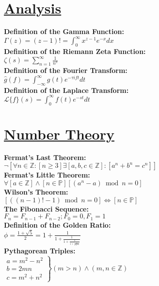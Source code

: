 \documentclass[12pt]{article}
\begin{document}
\section*{\underline{Analysis}}
\textbf{Definition of the Gamma Function:}
    \\ \( \Gamma( z ) = ( z - 1 )! = \displaystyle\int_{0}^{\infty} { x^{z - 1} e^{-x} dx } \)
\\ \textbf{Definition of the Riemann Zeta Function:}
    \\ \( \zeta( s ) = \displaystyle\sum_{n = 1}^{\infty} { \displaystyle\frac{ 1 }{ n^s } } \)
\\ \textbf{Definition of the Fourier Transform:}
    \\ \( \hat{g}( f ) = \displaystyle\int_{-\infty}^{\infty} { g( t ) e^{-\tau i ft} dt } \)
\\ \textbf{Definition of the Laplace Transform:}
    \\ \( \mathcal{L} \{ f \} ( s ) = \displaystyle\int_{0}^{\infty} { f( t ) e^{-st} dt } \)



\section*{\underline{Number Theory}}
\textbf{Fermat’s Last Theorem:}
    \\ \( \lnot [ \forall n \in \mathbb{Z} : [ n \ge 3 ] \exists [a, b, c \in \mathbb{Z} ] : [ a^n +b^n = c^n ] ] \)
\\ \textbf{Fermat’s Little Theorem:}
    \\ \( \forall [ a \in \mathbb{Z} ] \land [ n \in \mathbb{P} ] [ ( a^n - a ) \bmod n = 0 ] \)
\\ \textbf{Wilson’s Theorem:}
    \\ \( [ ( ( n - 1 )! - 1 ) \bmod n = 0 ] \iff [ n \in \mathbb{P}] \)
\\ \textbf{The Fibonacci Sequence:}
    \\ \( F_n = F_{n - 1} + F_{n - 2} ; F_0 = 0, F_1 = 1 \)
\\ \textbf{Definition of the Golden Ratio:}
    \\ \( \phi = \displaystyle\frac{ 1 + \sqrt{ 5 } }{ 2 } = 1 + \displaystyle\frac{ 1 }{ 1 + \displaystyle\frac{ 1 }{ 1 + \displaystyle\frac{ 1 }{ 1 + \displaystyle\frac{ 1 }{ 1 + ... } } } } \)
\\ \textbf{Pythagorean Triples:}
    \\ \( \left. \substack{ a = m^2 - n^2 \\ b = 2mn \\ c = m^2 + n^2 } \right\} ( m > n ) \land ( m, n \in \mathbb{Z} ) \)
\end{document}
